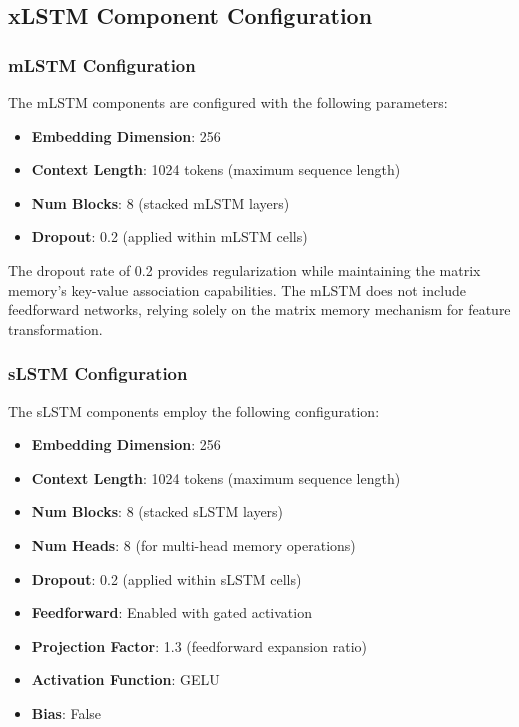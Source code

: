\subsection{xLSTM Component Configuration}
\label{sec:xlstm_configuration}

\subsubsection{mLSTM Configuration}
\label{sec:mlstm_config}

The \ac{mLSTM} components are configured with the following parameters:

\begin{itemize}
    \item \textbf{Embedding Dimension}: 256
    \item \textbf{Context Length}: 1024 tokens (maximum sequence length)
    \item \textbf{Num Blocks}: 8 (stacked \ac{mLSTM} layers)
    \item \textbf{Dropout}: 0.2 (applied within \ac{mLSTM} cells)
\end{itemize}

The dropout rate of 0.2 provides regularization while maintaining the matrix memory's key-value association capabilities. The \ac{mLSTM} does not include feedforward networks, relying solely on the matrix memory mechanism for feature transformation.

\subsubsection{sLSTM Configuration}
\label{sec:slstm_config}

The \ac{sLSTM} components employ the following configuration:

\begin{itemize}
    \item \textbf{Embedding Dimension}: 256
    \item \textbf{Context Length}: 1024 tokens (maximum sequence length)
    \item \textbf{Num Blocks}: 8 (stacked \ac{sLSTM} layers)
    \item \textbf{Num Heads}: 8 (for multi-head memory operations)
    \item \textbf{Dropout}: 0.2 (applied within \ac{sLSTM} cells)
    \item \textbf{Feedforward}: Enabled with gated activation
    \item \textbf{Projection Factor}: 1.3 (feedforward expansion ratio)
    \item \textbf{Activation Function}: GELU
    \item \textbf{Bias}: False
\end{itemize}

